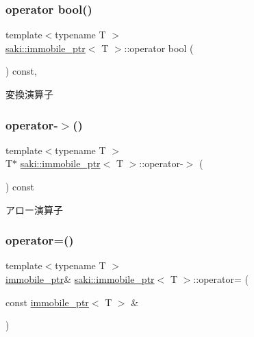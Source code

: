 \subsubsection{\texorpdfstring{operator bool()}{operator bool()}}
{\footnotesize\ttfamily template$<$typename T $>$ \\
\mbox{\hyperlink{classsaki_1_1immobile__ptr}{saki\+::immobile\+\_\+ptr}}$<$ T $>$\+::operator bool (\begin{DoxyParamCaption}{ }\end{DoxyParamCaption}) const\hspace{0.3cm}{\ttfamily [inline]}, {\ttfamily [explicit]}}



変換演算子 

\mbox{\label{classsaki_1_1immobile__ptr_af834ac0a7db7da5e88a88584e7d1e453}} 
\subsubsection{\texorpdfstring{operator-\/$>$()}{operator->()}}
{\footnotesize\ttfamily template$<$typename T $>$ \\
T$\ast$ \mbox{\hyperlink{classsaki_1_1immobile__ptr}{saki\+::immobile\+\_\+ptr}}$<$ T $>$\+::operator-\/$>$ (\begin{DoxyParamCaption}{ }\end{DoxyParamCaption}) const\hspace{0.3cm}{\ttfamily [inline]}}



アロー演算子 

\mbox{\label{classsaki_1_1immobile__ptr_aeda073b50b1e44b9aacf91ac6ba3891b}} 
\subsubsection{\texorpdfstring{operator=()}{operator=()}\hspace{0.1cm}{\footnotesize\ttfamily [1/2]}}
{\footnotesize\ttfamily template$<$typename T $>$ \\
\mbox{\hyperlink{classsaki_1_1immobile__ptr}{immobile\+\_\+ptr}}\& \mbox{\hyperlink{classsaki_1_1immobile__ptr}{saki\+::immobile\+\_\+ptr}}$<$ T $>$\+::operator= (\begin{DoxyParamCaption}\item[{const \mbox{\hyperlink{classsaki_1_1immobile__ptr}{immobile\+\_\+ptr}}$<$ T $>$ \&}]{ }\end{DoxyParamCaption})\hspace{0.3cm}{\ttfamily [delete]}}

